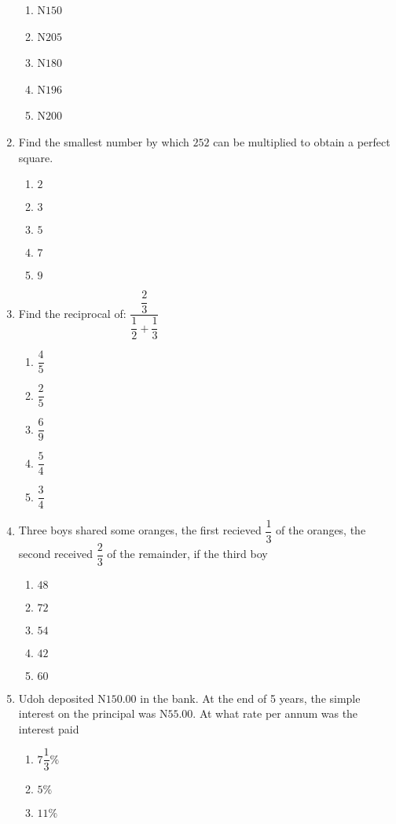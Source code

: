 \begin{multicols}{2}
\begin{enumerate}[label={\arabic*.}]
\begin{enumerate}[label={\Alph*.}]
    \item N\(150\)
    \item N\(205\)
    \item N\(180\)
    \item N\(196\)
    \item N\(200\)
    \end{enumerate}
\item Find the smallest number by which \(252\) can be multiplied to obtain a perfect square. 
    \begin{enumerate}[label={\Alph*.}]
    \item \(2\)
    \item \(3\)
    \item \(5\)
    \item \(7\)
    \item \(9\)
    \end{enumerate}
\item Find the reciprocal of: \(\dfrac{\dfrac{2}{3}}{\dfrac{1}{2} + \dfrac{1}{3}}\)
    \begin{enumerate}[label={\Alph*.}]
    \item \(\dfrac{4}{5}\)
    \item \(\dfrac{2}{5}\)
    \item \(\dfrac{6}{9}\)
    \item \(\dfrac{5}{4}\)
    \item \(\dfrac{3}{4}\)
    \end{enumerate}
\item Three boys shared some oranges, the first recieved \(\dfrac{1}{3}\) of the oranges, the second received \(\dfrac{2}{3}\) of the remainder, if the third boy
    \begin{enumerate}[label={\Alph*.}]
    \item \(48\)
    \item \(72\)
    \item \(54\)
    \item \(42\)
    \item \(60\)
    \end{enumerate}
\item Udoh deposited N\(150.00\) in the bank. At the end of 5 years, the simple interest on the principal was N\(55.00\). At what rate per annum was the interest paid 
    \begin{enumerate}[label={\Alph*.}]
    \item \(7\dfrac{1}{3}\%\)
    \item \(5\%\)
    \item \(11\%\)

\end{enumerate}
\end{enumerate}
\end{multicols}
